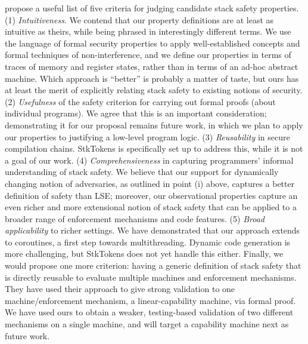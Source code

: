 \documentclass[acmsmall,review,anonymous]{acmart}\settopmatter{printfolios=true,printccs=false,printacmref=false}
\begin{document}
{{\begin{enumerate}[label=(\roman*)]
\end{enumerate}

\citet{SkorstengaardSTKJFP} propose a useful list of five criteria for judging
candidate stack safety properties.
%
(1) {\em Intuitiveness}. We contend that our property definitions are at least as
intuitive as theirs, while being phrased in interestingly different terms.
We use the language of formal security
properties to apply well-established concepts and formal techniques
of non-interference, and we define our properties in terms of
traces of memory and register states, rather than in terms of an
ad-hoc abstract machine.
Which approach is ``better'' is probably a matter of taste, but ours
has at least the merit of explicitly relating stack safety to existing
notions of security.
%
(2) {\em Usefulness} of the safety criterion
for carrying out formal proofs (about individual programs). We agree that this is an important consideration;
demonstrating it for our proposal remains future work, in which we
plan to apply our properties to justifying a low-level program logic.
%
(3) {\em Reusability} in secure compilation chains.
StkTokens
is specifically set up to address this,
while it is not a goal of
our work.
%
(4) {\em Comprehensiveness} in capturing programmers' informal
understanding of stack safety. We believe that our support
for dynamically changing notion of adversaries, as outlined in point (i) above,
captures a better definition of safety than LSE; moreover, our observational
properties capture an even richer and more extensional notion of stack safety
that can be applied to a broader range of enforcement mechanisms and code features.
%
(5) {\em Broad applicability} to richer settings. We have demonstrated that our approach extends to
coroutines, a first step towards multithreading. Dynamic code generation is
more challenging, but StkTokens does not yet handle this either.
%
Finally, we would propose one more criterion: having a generic definition
of stack safety that is directly reusable to evaluate multiple machines and
enforcement mechanisms. They have used their approach to give strong validation
to one machine/enforcement mechanism, a linear-capability machine,
via formal proof. We have used ours to obtain a weaker, testing-based validation of
two different mechanisms on a single machine, and will target a capability machine
next as future work.

}}
\end{document}
